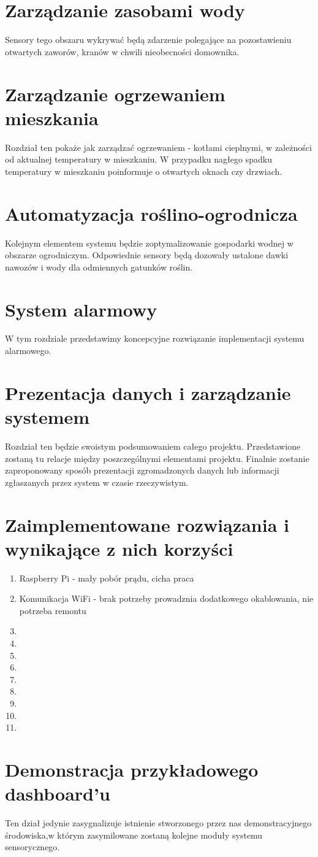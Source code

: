 \documentclass[12pt]{article} %
\begin{document}
\section{Zarządzanie zasobami wody}
Sensory tego obszaru wykrywać będą zdarzenie polegające na pozostawieniu otwartych zaworów, kranów w chwili nieobecności domownika.

\section{Zarządzanie ogrzewaniem mieszkania}
Rozdział ten pokaże jak zarządzać ogrzewaniem - kotłami cieplnymi, w zależności od aktualnej temperatury w mieszkaniu. W przypadku nagłego spadku temperatury w mieszkaniu poinformuje o otwartych oknach czy drzwiach.

\section{Automatyzacja roślino-ogrodnicza}
Kolejnym elementem systemu będzie zoptymalizowanie gospodarki wodnej w obszarze ogrodniczym. Odpowiednie sensory będą dozowały ustalone dawki nawozów i wody dla odmiennych gatunków roślin.

\section{System alarmowy}
W tym rozdziale przedstawimy koncepcyjne rozwiązanie implementacji systemu alarmowego.

\section{Prezentacja danych i zarządzanie systemem}
Rozdział ten będzie swoistym podsumowaniem całego projektu. Przedstawione zostaną tu relacje między poszczególnymi elementami projektu. Finalnie zostanie zaproponowany sposób prezentacji zgromadzonych danych lub informacji zgłaszanych przez system w czasie rzeczywistym.

\section{Zaimplementowane rozwiązania i wynikające z nich korzyści}
\begin{enumerate}
\item Raspberry Pi - mały pobór prądu, cicha praca
\item Komunikacja WiFi - brak potrzeby prowadznia dodatkowego okablowania, nie potrzeba remontu
\item 
\item 
\item 
\item 
\item 
\item 
\item 
\item 
\item 
\end{enumerate}

\section{Demonstracja przykładowego dashboard'u}
Ten dział jedynie zasygnalizuje istnienie stworzonego przez nas demonstracyjnego środowiska,w którym zasymilowane zostaną kolejne moduły systemu sensorycznego.
\end{document}
